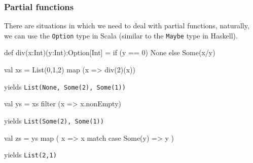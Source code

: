 \documentclass{beamer}
\newcommand{\beb}{\begin{exampleblock}}
\newcommand{\eeb}{\end{exampleblock}}
\begin{document}
\begin{frame}[fragile]
\frametitle{Partial functions}
There are situations in which we need to deal with partial functions, naturally, we
can use the {\tt Option} type in Scala (similar to the {\tt Maybe} type in
Haskell).
\beb{}
\begin{code}
def div(x:Int)(y:Int):Option[Int] =  {
    if (y == 0) None else Some(x/y)
}

val xs = List(0,1,2) map (x => div(2)(x))
\end{code}
\eeb
yields {\tt  List(None, Some(2), Some(1))}
\beb{}
\begin{code}
val ys = xs filter (x => x.nonEmpty) 
\end{code}
\eeb
yields {\tt List(Some(2), Some(1))}
\beb{}
\begin{code}
val zs = ys map ( x => x match { case Some(y) => y } ) 
\end{code}
\eeb
yields {\tt List(2,1)}
\end{frame}
\end{document}
